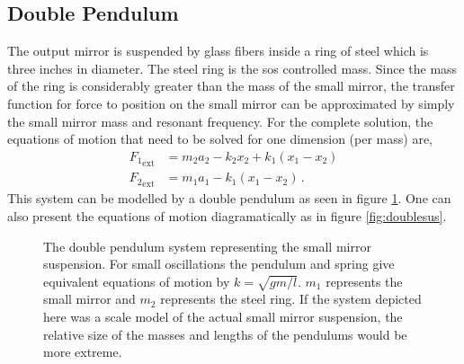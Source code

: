 \subsection{Double Pendulum}
The output mirror is suspended by glass fibers inside a ring of steel which is
three inches in diameter. The steel ring is the \ac{sos} controlled mass.
Since the mass of the ring is considerably greater than the mass of the small
mirror, the transfer function for force to position on the small mirror can be
approximated by simply the small mirror mass and resonant frequency.
For the complete solution, the equations of motion that need to be solved for
one dimension (per mass) are,
\begin{align}
{F_1}_{\mathrm{ext}} &= m_2a_2-k_2x_2+k_1\left(x_1-x_2\right) \\
{F_2}_{\mathrm{ext}} &= m_1a_1-k_1\left(x_1-x_2\right) \, .
\end{align}
This system can be modelled by a double pendulum as seen in figure
\ref{fig:doublependulum}.
One can also present the equations of motion diagramatically as in figure
\ref{fig:doublesus}.


\begin{figure}[hb]
\label{fig:doublependulum}
\centering
{}
\caption[Double Pendulum]{The double pendulum system representing the small
    mirror suspension. For small oscillations the pendulum and spring give
    equivalent equations of motion by $k=\sqrt{gm/l}$. $m_1$ represents the
    small mirror and $m_2$ represents the steel ring. If the system depicted
    here was a scale model of the actual small mirror suspension, the relative
    size of the masses and lengths of the pendulums would be more extreme.}
\end{figure}

